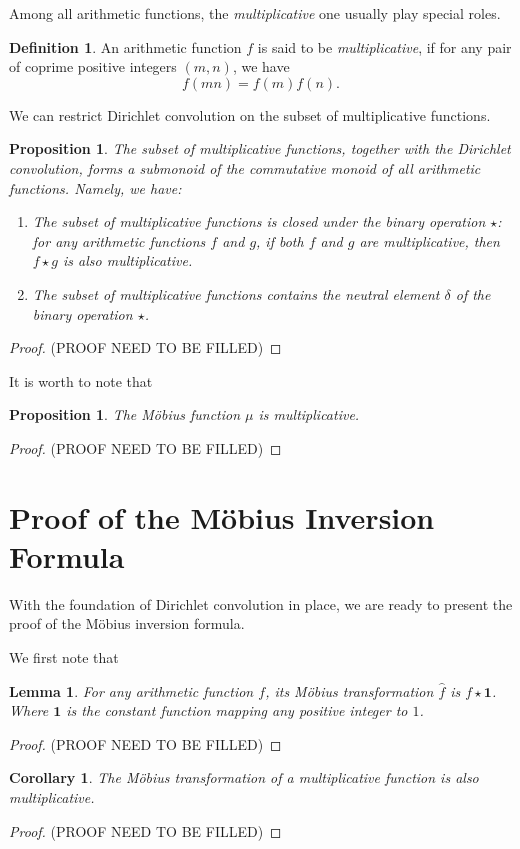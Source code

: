 \documentclass[11pt]{article}
\theoremstyle{plain}
\newtheorem{lemma}[theorem]{Lemma}
\newtheorem{proposition}[theorem]{Proposition}
\newtheorem{corollary}[theorem]{Corollary}
\theoremstyle{definition}
\newtheorem{definition}[theorem]{Definition}
\theoremstyle{remark}
\numberwithin{equation}{section}
\begin{document}
Among all arithmetic functions, the \emph{multiplicative} one usually play special roles. 
\begin{definition}
	An arithmetic function $f$ is said to be \emph{multiplicative}, if for any pair of coprime positive integers $(m,n)$, we have 
	\[
		f(mn) = f(m)f(n).
	\]
\end{definition}
We can restrict Dirichlet convolution on the subset of multiplicative functions.
\begin{proposition}
	The subset of multiplicative functions, together with the Dirichlet convolution, forms a submonoid of the commutative monoid of all arithmetic functions. Namely, we have:
	\begin{enumerate}
		\item The subset of multiplicative functions is closed under the binary operation $\star$: for any arithmetic functions $f$ and $g$, if both $f$ and $g$ are multiplicative, then $f\star g$ is also multiplicative.
		\item The subset of multiplicative functions contains the neutral element $\delta$ of the binary operation $\star$.
	\end{enumerate}
\end{proposition}
\begin{proof}
	{\color{red} (PROOF NEED TO BE FILLED)}
\end{proof}

It is worth to note that
\begin{proposition}
	The Möbius function $\mu$ is multiplicative.
\end{proposition}
\begin{proof}
	{\color{red} (PROOF NEED TO BE FILLED)}
\end{proof}

\section{Proof of the Möbius Inversion Formula}\label{sec:3}
With the foundation of Dirichlet convolution in place, we are ready to present the proof of the Möbius inversion formula. 

We first note that 
\begin{lemma}\label{lem:mi}
	For any arithmetic function $f$, its M\"obius transformation $\widehat{f}$ is $f\star\bm{1}$. 
	Where $\bm{1}$ is the constant function mapping any positive integer to $1$. 
\end{lemma}
\begin{proof}
	{\color{red} (PROOF NEED TO BE FILLED)}
\end{proof}
\begin{corollary}\label{cor:mtism}
	The M\"obius transformation of a multiplicative function is also multiplicative.
\end{corollary}
\begin{proof}
	{\color{red} (PROOF NEED TO BE FILLED)}
\end{proof}
\end{document}
